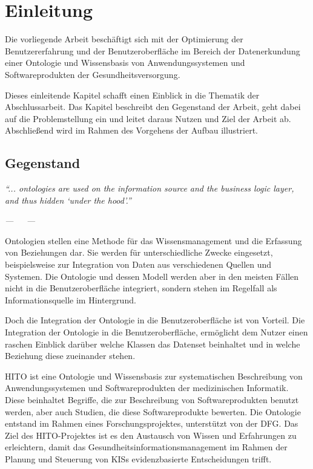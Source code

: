 \chapter{Einleitung}\label{ch:introduction}

Die vorliegende Arbeit beschäftigt sich mit der Optimierung der Benutzererfahrung und der Benutzeroberfläche im Bereich der Datenerkundung einer Ontologie und Wissensbasis von Anwendungssystemen und Softwareprodukten der Gesundheitsversorgung.

Dieses einleitende Kapitel schafft einen Einblick in die Thematik der Abschlussarbeit. 
Das Kapitel beschreibt den Gegenstand der Arbeit, geht dabei auf die Problemstellung ein und leitet daraus Nutzen und Ziel der Arbeit ab.
Abschließend wird im Rahmen des Vorgehens der Aufbau illustriert.

\section{Gegenstand}\label{sec:gegenstand}

\begin{center}
\textit{\enquote{... ontologies are used on the information source and the business logic layer, and thus hidden \enquote{under the hood}.}}
\end{center}

\begin{flushright}
\textit{---~~\cite{paulheim2010ontology}~---} \newline
\end{flushright}

Ontologien stellen eine Methode für das Wissensmanagement und die Erfassung von Beziehungen dar.
Sie werden für unterschiedliche Zwecke eingesetzt, beispielsweise zur Integration von Daten aus verschiedenen Quellen und Systemen.
Die Ontologie und dessen Modell werden aber in den meisten Fällen nicht in die Benutzeroberfläche integriert, sondern stehen im Regelfall als Informationsquelle im Hintergrund. \citep[vgl.]{paulheim2010ontology}

Doch die Integration der Ontologie in die Benutzeroberfläche ist von Vorteil. 
Die Integration der Ontologie in die Benutzeroberfläche, ermöglicht dem Nutzer einen raschen Einblick darüber welche Klassen das Datenset beinhaltet und in welche Beziehung diese zueinander stehen. \citep[vgl.]{linkeddatavisualization}

\ac{HITO} ist eine Ontologie und Wissensbasis zur systematischen Beschreibung von Anwendungssystemen und Softwareprodukten der medizinischen Informatik.
Diese beinhaltet Begriffe, die zur Beschreibung von Softwareprodukten benutzt werden, aber auch Studien, die diese Softwareprodukte bewerten.
Die Ontologie entstand im Rahmen eines Forschungsprojektes, unterstützt von der \ac{DFG}.
Das Ziel des HITO-Projektes ist es den Austausch von Wissen und Erfahrungen zu erleichtern, damit das Gesundheitsinformationsmanagement im Rahmen der Planung und Steuerung von \acp{KIS} evidenzbasierte Entscheidungen trifft.

